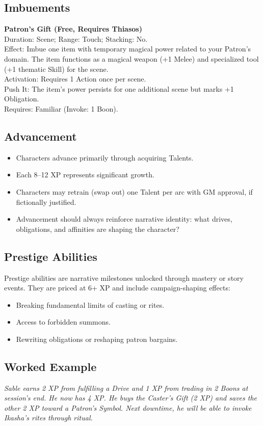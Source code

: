\subsection{Imbuements}
\textbf{Patron’s Gift (Free, Requires Thiasos)}\\
Duration: Scene; Range: Touch; Stacking: No.\\
Effect: Imbue one item with temporary magical power related to your Patron’s domain. The item functions as a magical weapon (+1 Melee) and specialized tool (+1 thematic Skill) for the scene.\\
Activation: Requires 1 Action once per scene.\\
Push It: The item’s power persists for one additional scene but marks +1 Obligation.\\
Requires: Familiar (Invoke: 1 Boon).

\subsection{Advancement}
\begin{itemize}
  \item Characters advance primarily through acquiring Talents.
  \item Each 8–12 XP represents significant growth.
  \item Characters may retrain (swap out) one Talent per arc with GM approval, if fictionally justified.
  \item Advancement should always reinforce narrative identity: what drives, obligations, and affinities are shaping the character?
\end{itemize}

\subsection{Prestige Abilities}
Prestige abilities are narrative milestones unlocked through mastery or story events. They are priced at 6+ XP and include campaign-shaping effects:
\begin{itemize}
  \item Breaking fundamental limits of casting or rites.
  \item Access to forbidden summons.
  \item Rewriting obligations or reshaping patron bargains.
\end{itemize}

\subsection{Worked Example}
\emph{Sable earns 2 XP from fulfilling a Drive and 1 XP from trading in 2 Boons at session’s end. He now has 4 XP. He buys the Caster’s Gift (2 XP) and saves the other 2 XP toward a Patron’s Symbol. Next downtime, he will be able to invoke Ikasha’s rites through ritual.}

